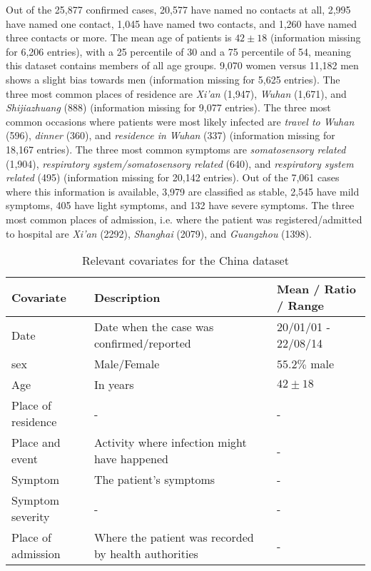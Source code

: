Out of the 25,877 confirmed cases, 20,577 have named no contacts at all, 2,995 have named one contact, 1,045 have named two contacts, and 1,260 have named three contacts or more. The mean age of patients is $42\pm18$ (information missing for 6,206 entries), with a 25 percentile of 30 and a 75 percentile of 54, meaning this dataset contains members of all age groups. 9,070 women versus 11,182 men shows a slight bias towards men (information missing for 5,625 entries). The three most common places of residence are \emph{Xi'an} (1,947), \emph{Wuhan} (1,671), and \emph{Shijiazhuang} (888) (information missing for 9,077 entries). The three most common occasions where patients were most likely infected are \emph{travel to Wuhan} (596), \emph{dinner} (360), and \emph{residence in Wuhan} (337) (information missing for 18,167 entries). The three most common symptoms are \emph{somatosensory related} (1,904), \emph{respiratory system/somatosensory related} (640), and \emph{respiratory system related} (495) (information missing for 20,142 entries). Out of the 7,061 cases where this information is available, 3,979 are classified as stable, 2,545 have mild symptoms, 405 have light symptoms, and 132 have severe symptoms. The three most common places of admission, i.e. where the patient was registered/admitted to hospital are \emph{Xi'an} (2292), \emph{Shanghai} (2079), and \emph{Guangzhou} (1398).

\begin{table}
	\begin{mdframed}
		\begin{tabularx}{\linewidth}{XXX}
		\hline
		\textbf{Covariate} & \textbf{Description} & \textbf{Mean / Ratio / Range}\\
		\hline
		\hline
		Date & Date when the case was confirmed/reported & 20/01/01 - 22/08/14\\
		\hline
		sex & Male/Female & $55.2\%$ male\\
		\hline
		Age & In years & $42\pm18$ \\
		\hline
		Place of residence & - & -\\
		\hline
		Place and event & Activity where infection might have happened & - \\
		\hline
		Symptom & The patient's symptoms & - \\
		\hline
		Symptom severity & - & - \\
		\hline
		Place of admission & Where the patient was recorded by health authorities & - \\
		\hline
		\hline
	\end{tabularx}
	\caption{Relevant covariates for the China dataset}
	\label{tab:china_covariates}
	\end{mdframed}
\end{table}

